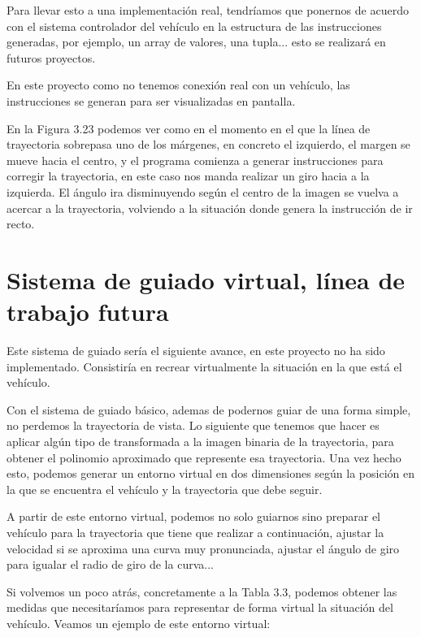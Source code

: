 Para llevar esto a una implementación real, tendríamos que ponernos de acuerdo con el sistema controlador del vehículo en la estructura de las instrucciones generadas, por ejemplo, un array de valores, una tupla... esto se realizará en futuros proyectos.

En este proyecto como no tenemos conexión real con un vehículo, las instrucciones se generan para ser visualizadas en pantalla.


En la Figura 3.23 podemos ver como en el momento en el que la línea de trayectoria sobrepasa uno de los márgenes, en concreto el izquierdo, el margen se mueve hacia el centro, y el programa comienza a generar instrucciones para corregir la trayectoria, en este caso nos manda realizar un giro hacia a la izquierda. El ángulo ira disminuyendo según el centro de la imagen se vuelva a acercar a la trayectoria, volviendo a la situación donde genera la instrucción de ir recto.


\section{Sistema de guiado virtual, línea de trabajo futura}
Este sistema de guiado sería el siguiente avance, en este proyecto no ha sido implementado. Consistiría en recrear virtualmente la situación en la que está el vehículo. 

Con el sistema de guiado básico, ademas de podernos guiar de una forma simple, no perdemos la trayectoria de vista. Lo siguiente que tenemos que hacer es aplicar algún tipo de transformada a la imagen binaria de la trayectoria, para obtener el polinomio aproximado que represente esa trayectoria. Una vez hecho esto, podemos generar un entorno virtual en dos dimensiones según la posición en la que se encuentra el vehículo y la trayectoria que debe seguir.

A partir de este entorno virtual, podemos no solo guiarnos sino preparar el vehículo para la trayectoria que tiene que realizar a continuación, ajustar la velocidad si se aproxima una curva muy pronunciada, ajustar el ángulo de giro para igualar el radio de giro de la curva...

Si volvemos un poco atrás, concretamente a la Tabla 3.3, podemos obtener las medidas que necesitaríamos para representar de forma virtual la situación del vehículo. Veamos un ejemplo de este entorno virtual:


